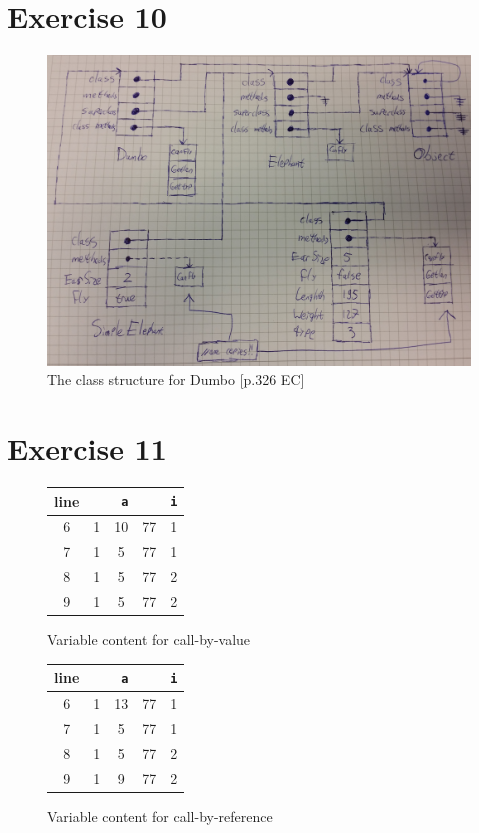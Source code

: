\documentclass[11pt]{article} %
\begin{document}
\section*{Exercise 10}
\begin{figure}[H]
\includegraphics[width=\textwidth]{Ex5-10.jpg}
\caption{The class structure for Dumbo [p.326 EC]}
\end{figure}

\section*{Exercise 11}
\begin{figure}[H]
\centering
\begin{tabular}{ccccc}
line & \multicolumn{3}{c}{\texttt{a}} & \texttt{i} \\ 
\hline 
6 & 1 & 10 & 77 & 1 \\ 
7 & 1 & 5 & 77 & 1 \\ 
8 & 1 & 5 & 77 & 2 \\ 
9 & 1 & 5 & 77 & 2 \\ 
\hline 
\end{tabular} 
\caption{Variable content for call-by-value}
\end{figure}

\begin{figure}[H]
\centering
\begin{tabular}{ccccc}
line & \multicolumn{3}{c}{\texttt{a}} & \texttt{i} \\ 
\hline 
6 & 1 & 13 & 77 & 1 \\ 
7 & 1 & 5 & 77 & 1 \\ 
8 & 1 & 5 & 77 & 2 \\ 
9 & 1 & 9 & 77 & 2 \\ 
\hline 
\end{tabular} 
\caption{Variable content for call-by-reference}
\end{figure}
\end{document}
